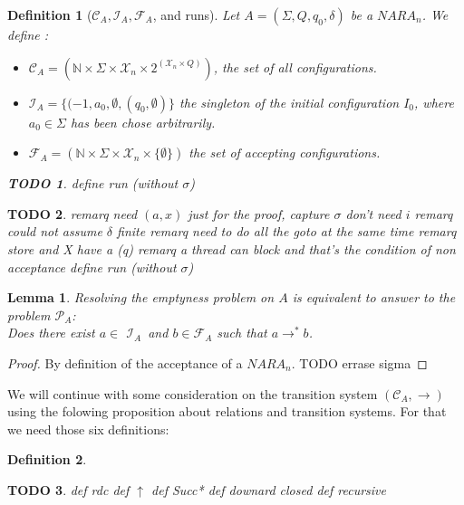 \documentclass[a4paper,10pt]{report}
\newtheorem{lm}{Lemma}[thr]
\newtheorem{df}{Definition}
\newtheorem{td}{TODO}
\newcommand{\C}{\mathcal{C}_{A}}
\newcommand{\I}{\mathcal{I}_{A}}
\newcommand{\F}{\mathcal{F}_{A}}
\newcommand{\X}{\mathcal{X}_{n}}
\newcommand{\pb}{$\mathcal{P}_{A}$}
\begin{document}
\begin{df}[$\C,\I,\F$, and runs]
Let $A = (\Sigma ,Q ,q_0, \delta )$ be a $NARA_n$. We define :
\begin{itemize}
 \item $\C = (\mathbb N \times \Sigma \times \X \times 2^{(\X \times Q)})$, the set of all configurations.
 \item $\I = \{(-1,a_0,\emptyset,(q_0,\emptyset)\}$  the singleton of the initial configuration $I_0$, where $a_0 \in \Sigma$ has been chose arbitrarily.
 \item $\F = (\mathbb N \times \Sigma \times \X \times \{\emptyset\})$ the set of accepting configurations.
\end{itemize}


\begin{td}
  define run (without $\sigma$)

\end{td}


\end{df}



\begin{td}
remarq need $(a,x)$ just for the proof, capture $\sigma$ don't need $i$
remarq could not assume $\delta$ finite
remarq need to do all the goto at the same time
remarq store and X have a (q)
remarq a thread can block and that's the condition of non acceptance
define run (without $\sigma$)

\end{td}





\begin{lm}
  \label{lmtth}
  Resolving the emptyness problem on $A$ is equivalent to answer to the problem \pb: \\
  Does there exist $a \in$ $\I$\ and $b \in\F$ such that $ a \rightarrow^* b $. 
\end{lm}
\begin{proof} 
  By definition of the acceptance of a $NARA_n$. TODO errase sigma
\end{proof}
We will continue with some consideration on the transition system $(\C,\rightarrow)$ using the folowing proposition about relations and transition systems.
For that we need those six definitions:
\begin{df}
 
\end{df}



\begin{td}
def rdc
def $\uparrow$
def Succ*
def downard closed
def recursive
\end{td}
\end{document}

